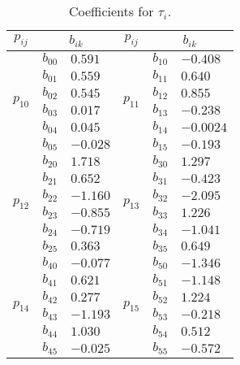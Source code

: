 %
\begin{table}[tb]
	\centering
	\caption{Coefficients for $\tau_i$.}
	\label{T:ti}
	\begin{tabular}{@{}cll|cll@{}}
		\hline
		$p_{ij}$                  & \multicolumn{2}{c}{$b_{ik}$} & $p_{ij}$ & \multicolumn{2}{c}{$b_{ik}$}\\
		\hline
		\multirow{6}{*}{$p_{10}$} & $b_{00}$  & $0.591$
		&   \multirow{6}{*}{$p_{11}$} & $b_{10}$ & $-0.408$
		\\ %
		& $b_{01}$      & $0.559$   &  	& $b_{11}$      & $0.640$ \\ %
		& $b_{02}$      & $0.545$   &	& $b_{12}$      & $0.855$ \\ %
		& $b_{03}$      & $0.017$   &	& $b_{13}$      & $-0.238$ \\ %
		& $b_{04}$      & $0.045$  & 	& $b_{14}$      & $-0.0024$  \\ %
		& $b_{05}$      & $-0.028$   &	& $b_{15}$      & $-0.193$    \\ \hline
		\multirow{6}{*}{$p_{12}$} & $b_{20}$  & $1.718$
		& \multirow{6}{*}{$p_{13}$} & $b_{30}$ & $1.297$ \\ %
		& $b_{21}$      & $0.652$   & & $b_{31}$      & $-0.423$  \\ %
		& $b_{22}$      & $-1.160$   & & $b_{32}$      & $-2.095$  \\ %
		& $b_{23}$      & $-0.855$    & & $b_{33}$      & $1.226$   \\ %
		& $b_{24}$      & $-0.719$  & & $b_{34}$      & $-1.041$  \\ %
		& $b_{25}$      & $0.363$   & & $b_{35}$      & $0.649$  \\ \hline
		\multirow{6}{*}{$p_{14}$} & $b_{40}$      & $-0.077$  & \multirow{6}{*}{$p_{15}$} & $b_{50}$      & $-1.346$   \\ %
		& $b_{41}$      & $0.621$     &  & $b_{51}$      & $-1.148$\\ %
		& $b_{42}$      & $0.277$     &  & $b_{52}$      & $1.224$\\ %
		& $b_{43}$      & $-1.193$    &  & $b_{53}$      & $-0.218$\\ %
		& $b_{44}$      & $1.030$     &  & $b_{54}$      & $0.512$\\ %
		& $b_{45}$      & $-0.025$   &  & $b_{55}$      & $-0.572$\\
		\hline
	\end{tabular}
\end{table}
